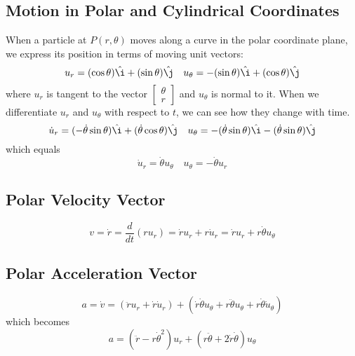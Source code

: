 \documentclass[12pt]{article}
\theoremstyle{break}
\numberwithin{theorem}{subsection}
\numberwithin{lemma}{subsection}
\numberwithin{corollary}{subsection}
\numberwithin{equation}{subsection}
\newcommand{\ihat}{\hat \i}
\newcommand{\jhat}{\hat \j}
\begin{document}
\subsection{Motion in Polar and Cylindrical Coordinates}
When a particle at $P(r,\theta)$ moves along a curve in the polar coordinate plane, we express its
position in terms of moving unit vectors:
\begin{equation*}
u_r = (\cos \theta) \ihat + (\sin \theta) \jhat \quad u_\theta = -(\sin \theta)\ihat + (\cos \theta)\jhat
\end{equation*}
where $u_r$ is tangent to the vector $\begin{bmatrix} \theta \\ r \end{bmatrix}$ and $u_\theta$ is 
normal to it. When we differentiate $u_r$ and $u_\theta$ with respect to $t$, we can see how they 
change with time.
\begin{equation*}
\dot u_r = (-\dot{\theta}\sin \theta) \ihat + (\dot{\theta}\cos \theta) \jhat \quad 
u_\theta = -(\dot{\theta}\sin \theta) \ihat - (\dot{\theta}\sin \theta) \jhat
\end{equation*}
which equals 
\begin{equation*}
\dot u_r = \dot{\theta} u_\theta \quad u_\theta = -\dot{\theta} u_r
\end{equation*}

\subsection{Polar Velocity Vector}
\begin{equation*}
v = \dot r = \frac{d}{dt} \left( r u_r \right) = \dot r u_r + r \dot u_r = \dot r u_r + r \dot \theta u_\theta
\end{equation*}

\subsection{Polar Acceleration Vector}
\begin{equation*}
a = \dot v = (\ddot r u_r + \dot r \dot u_r) + 
(\dot r \dot \theta u_\theta + r \ddot \theta u_\theta + r \dot \theta \dot u_\theta)
\end{equation*}
which becomes 
\begin{equation*}
a = (\ddot r - r \dot \theta^2)u_r + (r \ddot \theta + 2 \dot r \dot \theta) u_\theta
\end{equation*}
\end{document}
